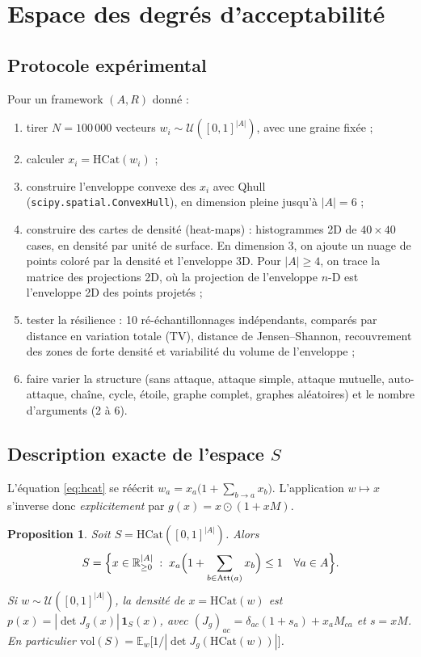 \documentclass[10pt,a4paper]{article}
\newtheorem{proposition}{Proposition}
\theoremstyle{remark}
\newcommand{\Att}{\mathrm{Att}}
\newcommand{\HCat}{\mathrm{HCat}}
\begin{document}
\section{Espace des degrés d'acceptabilité}

\subsection{Protocole expérimental}

Pour un framework $(A,R)$ donné :
\begin{enumerate}
\item tirer $N=100\,000$ vecteurs $w_i\sim\mathcal U([0,1]^{|A|})$, avec une graine fixée ;
\item calculer $x_i=\HCat(w_i)$ ;
\item construire l'enveloppe convexe des $x_i$ avec Qhull (\texttt{scipy.spatial.ConvexHull}),
en dimension pleine jusqu'à $|A|=6$ ;
\item construire des cartes de densité (heat-maps) : histogrammes 2D de $40\times40$ cases,
en densité par unité de surface. En dimension 3, on ajoute un nuage de points coloré par la
densité et l'enveloppe 3D. Pour $|A|\ge4$, on trace la matrice des projections 2D, où la
projection de l'enveloppe $n$-D est l'enveloppe 2D des points projetés ;
\item tester la résilience : 10 ré-échantillonnages indépendants, comparés par distance
en variation totale (TV), distance de Jensen--Shannon, recouvrement des zones de forte
densité et variabilité du volume de l'enveloppe ;
\item faire varier la structure (sans attaque, attaque simple, attaque mutuelle, auto-attaque,
chaîne, cycle, étoile, graphe complet, graphes aléatoires) et le nombre d'arguments (2 à 6).
\end{enumerate}

\subsection{Description exacte de l'espace \texorpdfstring{$S$}{S}}

L'équation \eqref{eq:hcat} se réécrit $w_a = x_a\bigl(1+\sum_{b\to a}x_b\bigr)$.
L'application $w\mapsto x$ s'inverse donc \emph{explicitement} par $g(x)=x\odot(1+xM)$.

\begin{proposition}\label{prop:S}
Soit $S=\HCat([0,1]^{|A|})$. Alors
\[
S=\Bigl\{x\in\mathbb R^{|A|}_{\ge 0} \;:\; x_a\Bigl(1+\sum_{b\in\Att(a)}x_b\Bigr)\le 1\quad\forall a\in A\Bigr\}.
\]
Si $w\sim\mathcal U([0,1]^{|A|})$, la densité de $x=\HCat(w)$ est
$p(x)=|\det J_g(x)|\,\mathbf 1_S(x)$, avec
$(J_g)_{ac}=\delta_{ac}(1+s_a)+x_aM_{ca}$ et $s=xM$. En particulier
$\mathrm{vol}(S)=\mathbb E_w\bigl[1/|\det J_g(\HCat(w))|\bigr]$.
\end{proposition}
\end{document}

